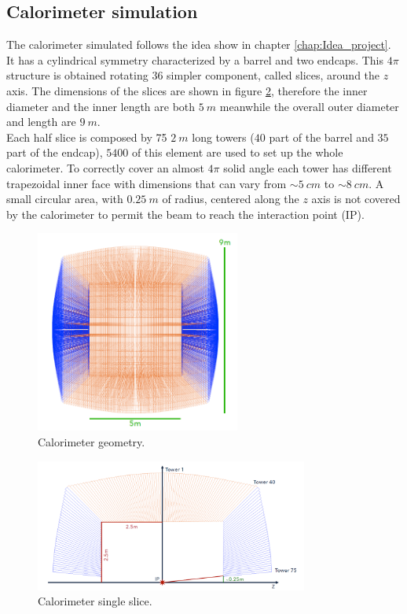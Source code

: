 \subsection{Calorimeter simulation} \label{subsec:Sim_cal}
The calorimeter simulated follows the idea show in chapter \ref{chap:Idea_project}. It has a cylindrical symmetry characterized by a barrel and two endcaps. This $4\pi$ structure is obtained rotating $36$ simpler component, called slices, around the $z$ axis. The dimensions of the slices are shown in figure \ref{fig:cal_slices}, therefore the inner diameter and  the inner length are both $5\ m$ meanwhile the overall outer diameter and length are $9\ m$.\\
Each half slice is composed by 75 $2\ m$ long towers ($40$ part of the barrel and $35$ part of the endcap), $5400$ of this element are used to set up the whole calorimeter.
To correctly cover an almost $4\pi$ solid angle each tower has different trapezoidal inner face with dimensions that can vary from $\sim 5\ cm$ to $\sim 8\ cm$.
A small circular area, with $0.25\ m$ of radius, centered along the $z$ axis is not covered by the calorimeter to permit the beam to reach the interaction point (IP).\\

\begin{figure}
	\centering
	\includegraphics[width=0.6\textwidth]{IMG/DRCGeometry3}
	\caption{Calorimeter geometry.}
	\label{fig:cal_geometry}
\end{figure}
\begin{figure}
	\centering
	\includegraphics[width=0.8\textwidth]{IMG/DRCGeometry1}
	\caption{Calorimeter single slice.}
	\label{fig:cal_slices}
\end{figure}

